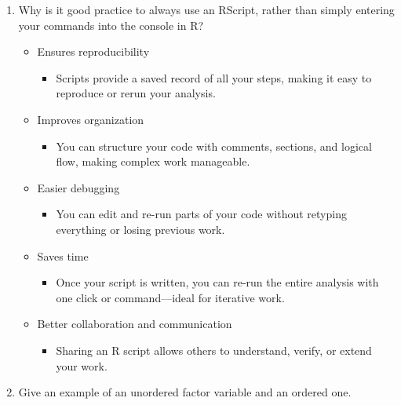 \documentclass[12pt,a4paper]{article}
\providecommand{\tightlist}{%
  \setlength{\itemsep}{0pt}\setlength{\parskip}{0pt}}
\begin{document}
\begin{enumerate}
\def\labelenumi{\arabic{enumi}.}
\tightlist
\item
  Why is it good practice to always use an RScript, rather than simply
  entering your commands into the console in R?

  \begin{itemize}
  \tightlist
  \item
    Ensures reproducibility

    \begin{itemize}
    \tightlist
    \item
      Scripts provide a saved record of all your steps, making it easy
      to reproduce or rerun your analysis.
    \end{itemize}
  \item
    Improves organization

    \begin{itemize}
    \tightlist
    \item
      You can structure your code with comments, sections, and logical
      flow, making complex work manageable.
    \end{itemize}
  \item
    Easier debugging

    \begin{itemize}
    \tightlist
    \item
      You can edit and re-run parts of your code without retyping
      everything or losing previous work.
    \end{itemize}
  \item
    Saves time

    \begin{itemize}
    \tightlist
    \item
      Once your script is written, you can re-run the entire analysis
      with one click or command---ideal for iterative work.
    \end{itemize}
  \item
    Better collaboration and communication

    \begin{itemize}
    \tightlist
    \item
      Sharing an R script allows others to understand, verify, or extend
      your work.
    \end{itemize}
  \end{itemize}
\item
  Give an example of an unordered factor variable and an ordered one.


\end{enumerate}
\end{document}

